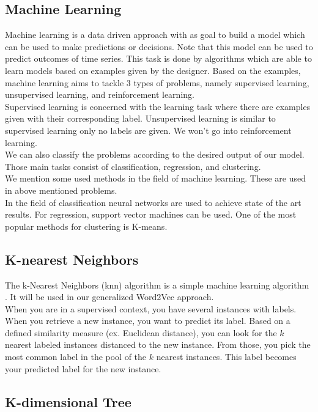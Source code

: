 	\subsection{Machine Learning}
Machine learning is a data driven approach with as goal to build a model which can be	used to make predictions or decisions. Note that this model can be used to predict outcomes of time series. This task is done by algorithms which are able to learn models based on examples given by the designer. Based on the examples, machine learning aims to tackle $3$ types of problems, namely supervised learning, unsupervised learning, and reinforcement learning. \\
Supervised learning is concerned with the learning task where there are examples given with their corresponding label. Unsupervised learning is similar to supervised learning only no labels are given. We won't go into reinforcement learning. \\
We can also classify the problems according to the desired output of our model. Those main tasks consist of classification, regression, and clustering. \\
	
We mention some used methods in the field of machine learning. These are used in above mentioned problems. \\
In the field of classification neural networks are used to achieve state of the art results. For regression, support vector machines can be used. One of the most popular methods for clustering is K-means. 

	\subsection{K-nearest Neighbors}
	\label{sec:knn}
	
The k-Nearest Neighbors (knn) algorithm is a simple machine learning algorithm \cite{knn:article}. It will be used in our generalized Word2Vec approach. \\
When you are in a supervised context, you have several instances with labels. When you retrieve a new instance, you want to predict its label. Based on a defined similarity measure (ex. Euclidean distance), you can look for the $k$ nearest labeled instances distanced to the new instance. From those, you pick the most common label in the pool of the $k$ nearest instances. This label becomes your predicted label for the new instance.
	
	
	\subsection{K-dimensional Tree}
	\label{sec:kdtree}
	
